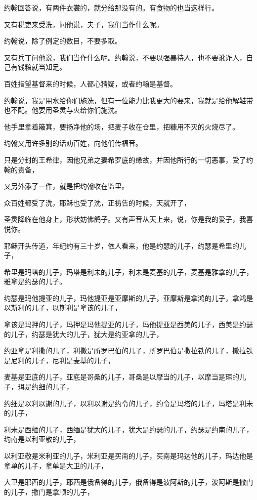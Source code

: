 \documentclass[12pt,oneside]{book}
\begin{document}
约翰回答说，有两件衣裳的，就分给那没有的。有食物的也当这样行。

又有税吏来受洗，问他说，夫子，我们当作什么呢。

约翰说，除了例定的数目，不要多取。

又有兵丁问他说，我们当作什么呢。约翰说，不要以强暴待人，也不要讹诈人，自己有钱粮就当知足。

百姓指望基督来的时候，人都心猜疑，或者约翰是基督。

约翰说，我是用水给你们施洗，但有一位能力比我更大的要来，我就是给他解鞋带也不配。他要用圣灵与火给你们施洗。

他手里拿着簸箕，要扬净他的场，把麦子收在仓里，把糠用不灭的火烧尽了。

约翰又用许多别的话劝百姓，向他们传福音。

只是分封的王希律，因他兄弟之妻希罗底的缘故，并因他所行的一切恶事，受了约翰的责备，

又另外添了一件，就是把约翰收在监里。

众百姓都受了洗，耶稣也受了洗，正祷告的时候，天就开了，

圣灵降临在他身上，形状妨佛鸽子。又有声音从天上来，说，你是我的爱子，我喜悦你。

耶稣开头传道，年纪约有三十岁，依人看来，他是约瑟的儿子，约瑟是希里的儿子，

希里是玛塔的儿子，玛塔是利未的儿子，利未是麦基的儿子，麦基是雅拿的儿子，雅拿是约瑟的儿子。

约瑟是玛他提亚的儿子，玛他提亚是亚摩斯的儿子，亚摩斯是拿鸿的儿子，拿鸿是以斯利的儿子，以斯利是拿该的儿子，

拿该是玛押的儿子，玛押是玛他提亚的儿子，玛他提亚是西美的儿子，西美是约瑟的儿子，约瑟是犹大的儿子，犹大是约亚拿的儿子，

约亚拿是利撒的儿子，利撒是所罗巴伯的儿子，所罗巴伯是撒拉铁的儿子，撒拉铁是尼利的儿子，尼利是麦基的儿子，

麦基是亚底的儿子，亚底是哥桑的儿子，哥桑是以摩当的儿子，以摩当是珥的儿子，珥是约细的儿子，

约细是以利以谢的儿子，以利以谢是约令的儿子，约令是玛塔的儿子，玛塔是利未的儿子，

利未是西缅的儿子，西缅是犹大的儿子，犹大是约瑟的儿子，约瑟是约南的儿子，约南是以利亚敬的儿子，

以利亚敬是米利亚的儿子，米利亚是买南的儿子，买南是玛达他的儿子，玛达他是拿单的儿子，拿单是大卫的儿子，

大卫是耶西的儿子，耶西是俄备得的儿子，俄备得是波阿斯的儿子，波阿斯是撒门的儿子，撒门是拿顺的儿子，
\end{document}
